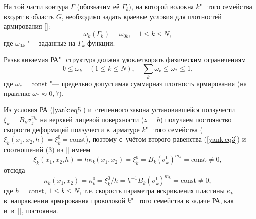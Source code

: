 На той части контура $\Gamma$ (обозначим её $\Gamma_k )$, на которой волокна $k$"=того семейства входят в область $G$, необходимо задать краевые условия для плотностей армирования []:
\begin{equation} \label{yank:eq7}
\omega_k (\Gamma_k )=\omega_{0k}, \quad 1\leq k \leq N,
\end{equation}
где $\omega_{0k}$ "--- заданные на $\Gamma_k $ функции.

Разыскиваемая РА"=структура должна удовлетворять физическим ограничениям
\begin{equation} \label{yank:eq8}
0\leq\omega_k  \quad (1\leq k \leq N), \quad \sum\limits_k \omega_k \leq \omega_{*}\leq 1,
\end{equation}
где $\omega_{*}=\text{const}$ "--- предельно допустимая суммарная плотность армирования (на практике $\omega_{*}\approx 0,7$).

\smallskip

Из условия РА (\ref{yank:eq5}) и~степенного закона установившейся ползучести $\xi_k =B_k \sigma_k ^{m_k }$ на верхней лицевой поверхности ($z=h$) получаем постоянство скорости деформаций ползучести в~арматуре $k$"=того семейства 
($\xi_k (x_1 , x_2 ,h)=\xi_k ^0 =\text{const}$), поэтому с~учётом второго равенства (\ref{yank:eq3}) и соотношений (3) из [] имеем
$$\xi_k (x_1 , x_2 ,h)=h\kappa_k (x_1 , x_2 )=\xi_k ^0 =B_k (\sigma_k ^0 )^{m_k }=\text{const}\neq0,$$
отсюда
\begin{equation} \label{yank:eq9}
\kappa_k (x_1 , x_2 )=\kappa_k ^0 =\xi_k ^0 /h=h^{-1}B_k (\sigma_k ^0 )^{m_k }=\text{const}\neq0,
\end{equation}
где $h=\text{const}$, $1\leq k\leq N$, т.е. скорость параметра искривления пластины $\kappa_k $ в~направлении армирования проволокой $k$"=того
семейства в задаче РА, как и~в~[], постоянна.

